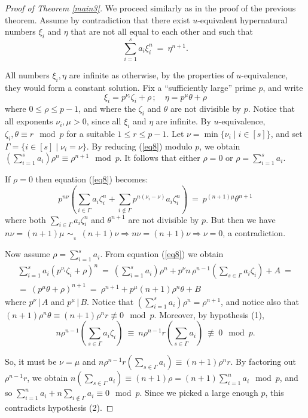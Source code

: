\documentclass[11pt]{amsart}
\theoremstyle{definition}
\theoremstyle{remark}
\numberwithin{equation}{section}
\begin{document}
\medskip
\begin{proof}[Proof of Theorem \ref{main3}]
We proceed similarly as in the proof of the previous theorem.
Assume by contradiction that there exist $u$-equivalent
hypernatural numbers $\xi_i$ and $\eta$
that are not all equal to each other and  such that 
\begin{equation}\label{eq8}
\sum_{i=1}^{s}a_i \xi_i^n\ =\ \eta^{n+1}.
\end{equation}

All numbers $\xi_i,\eta$ are infinite as otherwise,
by the properties of $u$-equi\-valence, they would 
form a constant solution. 
Fix a ``sufficiently large'' prime $p$,
and write
$$\xi_i=p^{\nu_i}\zeta_i+\rho\,;\quad
\eta=p^{\mu}\theta+\rho$$
where $0\le\rho\le p-1$, and where the $\zeta_i$ and $\theta$
are not divisible by $p$.
Notice that all exponents $\nu_i,\mu>0$,
since all $\xi_i$ and $\eta$ are infinite.
By $u$-equivalence, 
$\zeta_i,\theta\equiv r\mod p$
for a suitable $1\le r\le p-1$.
Let $\nu=\min\{\nu_i\mid i\in[s]\}$,
and set $\Gamma=\{i\in[s]\mid \nu_i=\nu\}$.
By reducing (\ref{eq8}) modulo $p$, we obtain
$(\sum_{i=1}^{s}a_i)\rho^n\equiv\rho^{n+1}\mod p$.
It follows that either
$\rho=0$ or $\rho=\sum_{i=1}^s a_i$.

\smallskip
If $\rho=0$ then equation (\ref{eq8}) becomes:
$$p^{n\nu}\left(\sum_{i\in\Gamma}a_i\zeta_i^n+
\sum_{i\notin\Gamma} p^{n(\nu_i-\nu)}a_i\zeta_i^n\right)\ =\ 
p^{(n+1)\mu}\theta^{n+1}$$
where both $\sum_{i\in\Gamma}a_i\zeta_i^n$
and $\theta^{n+1}$ are not divisible
by $p$. But then we have $n\nu=(n+1)\mu\,{{\,{\sim}_{{}_{\!\!\!\!\! u}}\;}}\,(n+1)\nu\Rightarrow 
n\nu=(n+1)\nu\Rightarrow \nu=0$, a contradiction. 

\smallskip
Now assume $\rho=\sum_{i=1}^s a_i$.
From equation (\ref{eq8}) we obtain
\begin{multline*}
\sum_{i=1}^{s}a_i(p^{\nu_i}\zeta_i+\rho)^n\ =\ 
\left(\sum_{i=1}^s a_i\right)\!\rho^n+
p^\nu n\,\rho^{n-1}\left(\sum_{s\in\Gamma}a_i\zeta_i\right)+A\ =
\\
=\ (p^{\mu}\theta+\rho)^{n+1}\ =\ 
\rho^{n+1}+
p^\mu(n+1)\rho^n\theta+ B
\end{multline*}
where $p^\nu\,|\,A$ and $p^\mu\,|\,B$.
Notice that 
$(\sum_{i=1}^s a_i)\rho^n=\rho^{n+1}$, and notice also that
$(n+1)\rho^n\theta\equiv(n+1)\rho^n r\not\equiv 0\mod p$. Moreover,
by hypothesis (1), 
$$n\rho^{n-1}\left(\sum_{s\in\Gamma}a_i\zeta_i\right)\ \equiv\ 
n\rho^{n-1}r\left(\sum_{s\in\Gamma}a_i\right)\ \not\equiv\ 0\mod p.$$

So, it must be $\nu=\mu$ and 
$n\rho^{n-1}r(\sum_{s\in\Gamma}a_i)\equiv
(n+1)\rho^n r$. By factoring out
$\rho^{n-1}r$, we obtain
$n(\sum_{s\in\Gamma}a_i)\equiv (n+1)\rho=
(n+1)\sum_{i=1}^n a_i\mod p$, and so
$\sum_{i=1}^n a_i+n\sum_{i\notin\Gamma}a_i\equiv 0\mod p$.
Since we picked a large enough $p$, this contradicts hypothesis (2).
\end{proof}
\end{document}
